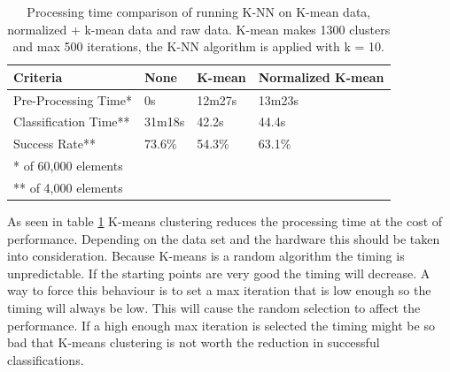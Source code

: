 \begin{table}[H]
\centering

\begin{tabular}{|l|p{2cm}|p{2cm}|p{2cm}|}\hline
Criteria              & None   & K-mean & Normalized K-mean \\ \hline
Pre-Processing Time*  & 0s     & 12m27s & 13m23s            \\ \hline
Classification Time** & 31m18s & 42.2s  & 44.4s             \\ \hline
Success Rate**        & 73.6\% & 54.3\% & 63.1\%            \\ \hline
\multicolumn{4}{|l|}{* of 60,000 elements} \\ 
\multicolumn{4}{|l|}{** of 4,000 elements} \\ \hline
\end{tabular}

\caption{Processing time comparison of running K-NN on K-mean data, normalized + k-mean data and raw data. 
K-mean makes 1300 clusters and max 500 iterations, the K-NN algorithm is applied with k = 10.}
\label{tab:processingtime_kmean_vs_raw_knn}
\end{table}

As seen in table \ref{tab:processingtime_kmean_vs_raw_knn} K-means clustering reduces the processing time at the cost of performance. 
Depending on the data set and the hardware this should be taken into consideration. 
Because K-means is a random algorithm the timing is unpredictable. If the starting points are very good the timing will decrease. 
A way to force this behaviour is to set a max iteration that is low enough so the timing will always be low.
This will cause the random selection to affect the performance. 
If a high enough max iteration is selected the timing might be so bad that K-means clustering is not worth the reduction in successful classifications.